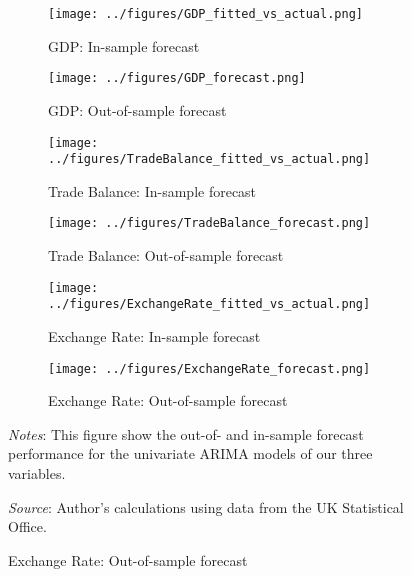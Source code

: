 \documentclass[
]{article}
\begin{document}
	\begin{figure}[htbp]
		\centering
		\caption{\textsc{Forecast performance for UK GDP, Exchange Rate, and Trade Balance}}
		\label{fig:forecast_results}
		\begin{subfigure}[b]{0.45\textwidth}
			\texttt{[image: ../figures/GDP\_fitted\_vs\_actual.png]}
			\caption{GDP: In-sample forecast}
			\label{fig:gdp_in}
		\end{subfigure}
		\hfill
		\begin{subfigure}[b]{0.45\textwidth}
			\texttt{[image: ../figures/GDP\_forecast.png]}
			\caption{GDP: Out-of-sample forecast}
			\label{fig:gdp_out}
		\end{subfigure}
		
		\begin{subfigure}[b]{0.45\textwidth}
			\texttt{[image: ../figures/TradeBalance\_fitted\_vs\_actual.png]}
			\caption{Trade Balance: In-sample forecast}
			\label{fig:tb_in}
		\end{subfigure}
		\hfill
		\begin{subfigure}[b]{0.45\textwidth}
			\texttt{[image: ../figures/TradeBalance\_forecast.png]}
			\caption{Trade Balance: Out-of-sample forecast}
			\label{fig:tb_out}
		\end{subfigure}
		
		\begin{subfigure}[b]{0.45\textwidth}
			\texttt{[image: ../figures/ExchangeRate\_fitted\_vs\_actual.png]}
			\caption{Exchange Rate: In-sample forecast}
			\label{fig:er_in}
		\end{subfigure}
		\hfill
		\begin{subfigure}[b]{0.45\textwidth}
			\texttt{[image: ../figures/ExchangeRate\_forecast.png]}
			\caption{Exchange Rate: Out-of-sample forecast}
			\label{fig:er_out}
		\end{subfigure}
		
		\begin{minipage}{\textwidth}
			\scriptsize
			\textit{Notes}: This figure show the out-of- and in-sample forecast performance for the univariate ARIMA models of our three variables.
			
			\textit{Source}: Author's calculations using data from the UK Statistical Office.
		\end{minipage}
	\end{figure}
	
\end{document}
